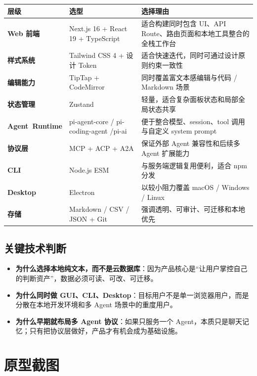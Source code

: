 \documentclass[11pt,a4paper]{ctexart}
\begin{document}
\begin{tabularx}{\textwidth}{@{}>{\raggedright\arraybackslash\bfseries}p{2.7cm}>{\raggedright\arraybackslash}p{4.8cm}X@{}}
\toprule
层级 & 选型 & 选择理由 \\
\midrule
Web 前端 & Next.js 16 + React 19 + TypeScript & 适合构建同时包含 UI、API Route、路由页面和本地工具整合的全栈工作台 \\
样式系统 & Tailwind CSS 4 + 设计 Token & 适合快速迭代，同时可通过设计原则约束一致性 \\
编辑能力 & TipTap + CodeMirror & 同时覆盖富文本感编辑与代码 / Markdown 场景 \\
状态管理 & Zustand & 轻量，适合复杂面板状态和局部全局状态共享 \\
Agent~Runtime & pi-agent-core / pi-coding-agent /\newline pi-ai & 便于整合模型、session、tool 调用与自定义 system prompt \\
协议层 & MCP + ACP + A2A & 保证外部 Agent 兼容性和后续多 Agent 扩展能力 \\
CLI & Node.js ESM & 与服务端逻辑复用便利，适合 npm 分发 \\
Desktop & Electron & 以较小阻力覆盖 macOS / Windows / Linux \\
存储 & Markdown / CSV / JSON + Git & 强调透明、可审计、可迁移和本地优先 \\
\bottomrule
\end{tabularx}

\subsection{关键技术判断}

\begin{itemize}
  \item \textbf{为什么选择本地纯文本，而不是云数据库}：因为产品核心是“让用户掌控自己的判断资产”，数据必须可读、可改、可迁移。
  \item \textbf{为什么同时做 GUI、CLI、Desktop}：目标用户不是单一浏览器用户，而是分散在本地开发环境和多 Agent 场景中的重度用户。
  \item \textbf{为什么早期就布局多 Agent 协议}：如果只服务一个 Agent，本质只是聊天记忆；只有把协议层做好，产品才有机会成为基础设施。
\end{itemize}

\section{原型截图}
\end{document}
